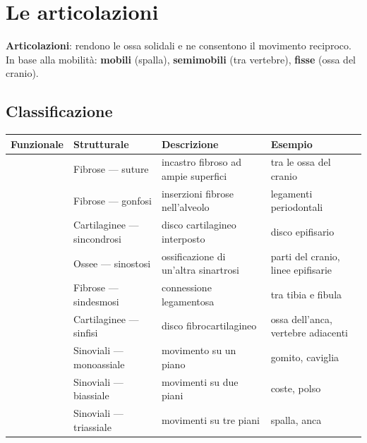\section{Le articolazioni}

\textbf{Articolazioni}: rendono le ossa solidali e ne consentono il movimento reciproco. In base
alla mobilità: \textbf{mobili} (spalla), \textbf{semimobili} (tra vertebre), \textbf{fisse}
(ossa del cranio).

\subsection{Classificazione}
\begin{table}[htbp]
  \centering \small \renewcommand{\arraystretch}{1.2}
  \begin{tabularx}{\textwidth}{|l|l|X|X|}
    \hline
    \textbf{Funzionale} & \textbf{Strutturale} & \textbf{Descrizione} & \textbf{Esempio} \\
    \hline
      & Fibrose --- suture & incastro fibroso ad ampie superfici & tra le ossa del cranio \\
      & Fibrose --- gonfosi & inserzioni fibrose nell'alveolo & legamenti periodontali \\
      & Cartilaginee --- sincondrosi & disco cartilagineo interposto & disco epifisario \\
      & Ossee --- sinostosi & ossificazione di un'altra sinartrosi & parti del cranio, linee epifisarie \\
    \hline
      & Fibrose --- sindesmosi & connessione legamentosa & tra tibia e fibula \\
      & Cartilaginee --- sinfisi & disco fibrocartilagineo & ossa dell'anca, vertebre adiacenti \\
    \hline
      & Sinoviali --- monoassiale & movimento su un piano & gomito, caviglia \\
      & Sinoviali --- biassiale & movimenti su due piani & coste, polso \\
      & Sinoviali --- triassiale & movimenti su tre piani & spalla, anca \\
    \hline
  \end{tabularx}
\end{table}

